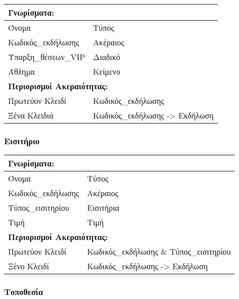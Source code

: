 \begin{tabular}{|p{6cm}|p{8cm}|}
  \multicolumn{2}{l}{\textbf{Γνωρίσματα:}}               \\ \hline
  Όνομα               & Τύπος                            \\ \hline
  Κωδικός\_εκδήλωσης  & Ακέραιος                         \\ \hline
  Ύπαρξη\_θέσεων\_VIP & Διαδικό                          \\ \hline
  Άθλημα              & Κείμενο                          \\ \hline
  \multicolumn{2}{l}{\textbf{Περιορισμοί Ακεραιότητας:}} \\ \hline
  Πρωτεύον Κλειδί     & Κωδικός\_εκδήλωσης               \\ \hline
  Ξένα Κλειδιά        & Κωδικός\_εκδήλωσης -> Εκδήλωση   \\ \hline
\end{tabular}

\subsubsection{Εισιτήριο}

\begin{tabular}{|p{6cm}|p{8cm}|}
  \multicolumn{2}{l}{\textbf{Γνωρίσματα:}}                     \\ \hline
  Όνομα              & Τύπος                                   \\ \hline
  Κωδικός\_εκδήλωσης & Ακέραιος                                \\ \hline
  Τύπος\_εισιτηρίου  & Εισιτήρια                               \\ \hline
  Τιμή               & Τιμή                                    \\ \hline
  \multicolumn{2}{l}{\textbf{Περιορισμοί Ακεραιότητας:}}       \\ \hline
  Πρωτεύον Κλειδί    & Κωδικός\_εκδήλωσης \& Τύπος\_εισιτηρίου \\ \hline
  Ξένο Κλειδί        & Κωδικός\_εκδήλωσης -> Εκδήλωση          \\ \hline
\end{tabular}


\subsubsection{Τοποθεσία}

